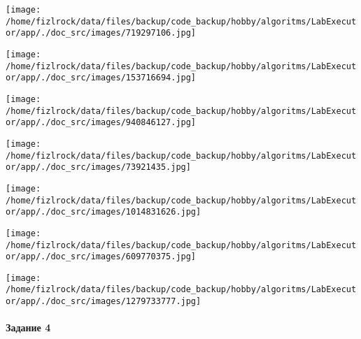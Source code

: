 \documentclass[a4paper, 12pt]{article}
\begin{document}
\texttt{[image: /home/fizlrock/data/files/backup/code\_backup/hobby/algoritms/LabExecutor/app/./doc\_src/images/719297106.jpg]}

\texttt{[image: /home/fizlrock/data/files/backup/code\_backup/hobby/algoritms/LabExecutor/app/./doc\_src/images/153716694.jpg]}

\texttt{[image: /home/fizlrock/data/files/backup/code\_backup/hobby/algoritms/LabExecutor/app/./doc\_src/images/940846127.jpg]}

\texttt{[image: /home/fizlrock/data/files/backup/code\_backup/hobby/algoritms/LabExecutor/app/./doc\_src/images/73921435.jpg]}

\texttt{[image: /home/fizlrock/data/files/backup/code\_backup/hobby/algoritms/LabExecutor/app/./doc\_src/images/1014831626.jpg]}

\texttt{[image: /home/fizlrock/data/files/backup/code\_backup/hobby/algoritms/LabExecutor/app/./doc\_src/images/609770375.jpg]}

\texttt{[image: /home/fizlrock/data/files/backup/code\_backup/hobby/algoritms/LabExecutor/app/./doc\_src/images/1279733777.jpg]}
\pagebreak
\paragraph{Задание 4}
\end{document}
